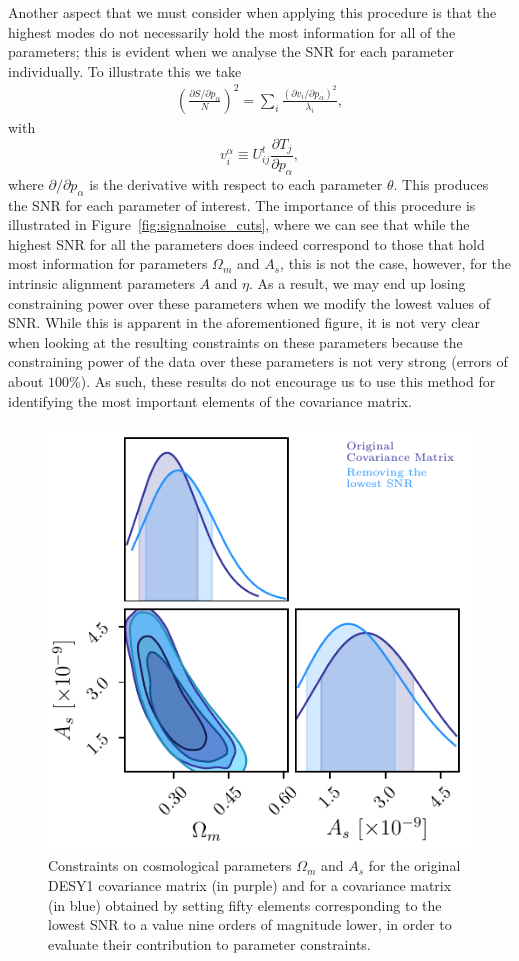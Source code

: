 \documentclass[twocolumn]{\docclass}
\newcommand{\rf}[1]{\ref{fig:#1}}
\newcommand\be{\begin{equation}}
\newcommand\ee{\end{equation}}
\def\bea{\begin{eqnarray}}
\def\eea{\end{eqnarray}}
\begin{document}
Another aspect that we must consider when applying this procedure is that the highest modes do not necessarily hold the most information for all of the parameters; this is evident when we analyse the SNR for each parameter individually. To illustrate this we take
\bea
\left(\frac{\partial S/\partial p_\alpha}{N}\right)^2 = \sum_{i} \frac{(\partial v_i / \partial p_\alpha)^2}{\lambda_i}
,\eea
with
\be
v_i^\alpha \equiv U_{ij}^t \frac{\partial T_j}{\partial p_\alpha}
,\ee
where $\partial /\partial p_\alpha$ is the derivative with respect to each parameter $\theta$. This produces the SNR for each parameter of interest. The importance of this procedure is illustrated in Figure~\rf{signalnoise_cuts}, where we can see that while the highest SNR for all the parameters does indeed correspond to those that hold most information for parameters $\Omega_m$ and $A_s$, this is not the case, however, for the intrinsic alignment parameters $A$ and $\eta$. As a result, we may end up losing constraining power over these parameters when we modify the lowest values of SNR. While this is apparent in the aforementioned figure, it is not very clear when looking at the resulting constraints on these parameters because the constraining power of the data over these parameters is not very strong (errors of about $100 \%$). As such, these results do not encourage us to use this method for identifying the most important elements of the covariance matrix.

\begin{figure}
\includegraphics[width=0.9\columnwidth]{SN.pdf}
\caption{Constraints on cosmological parameters $\Omega_m$ and $A_s$ for the original DESY1 covariance matrix (in purple) and for a covariance matrix (in blue) obtained by setting fifty elements corresponding to the lowest SNR to a value nine orders of magnitude lower, in order to evaluate their contribution to parameter constraints. \label{fig:signalnoise}}
\end{figure}
\end{document}
